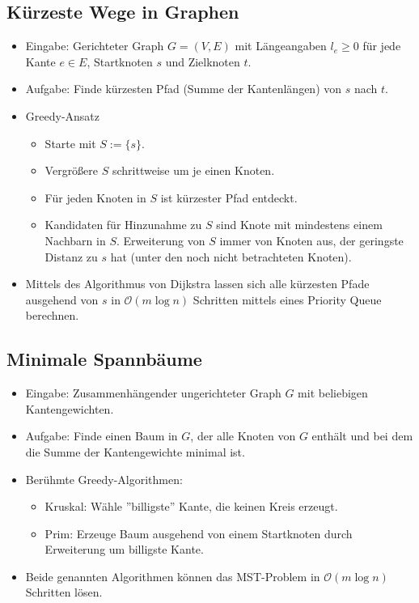 \documentclass{scrartcl}
\begin{document}
\subsection{Kürzeste Wege in Graphen}

\begin{itemize}
	\item Eingabe: Gerichteter Graph $ G = (V,E) $ mit Längeangaben $ l_e \geq 0 $ für jede Kante $ e \in E $, Startknoten $ s $ und Zielknoten $ t $.
	\item Aufgabe: Finde kürzesten Pfad (Summe der Kantenlängen) von $ s $ nach $ t $.
	\item Greedy-Ansatz
	\begin{itemize}
		\item Starte mit $ S := \{ s \} $.
		\item Vergrößere $ S $ schrittweise um je einen Knoten.
		\item Für jeden Knoten in $ S $ ist kürzester Pfad entdeckt.
		\item Kandidaten für Hinzunahme zu $ S $ sind Knote mit mindestens einem Nachbarn in $ S $. Erweiterung von $ S $ immer von Knoten aus, der geringste Distanz zu $ s $ hat (unter den noch nicht betrachteten Knoten).
	\end{itemize}
	\item Mittels des Algorithmus von Dijkstra lassen sich alle kürzesten Pfade ausgehend von $ s $ in $ \mathcal{O}(m \log n) $ Schritten mittels eines Priority Queue berechnen.
\end{itemize}

\subsection{Minimale Spannbäume}

\begin{itemize}
	\item Eingabe: Zusammenhängender ungerichteter Graph $ G $ mit beliebigen Kantengewichten.
	\item Aufgabe: Finde einen Baum in $ G $, der alle Knoten von $ G $ enthält und bei dem die Summe der Kantengewichte minimal ist.
	\item Berühmte Greedy-Algorithmen:
	\begin{itemize}
		\item Kruskal: Wähle ''billigste'' Kante, die keinen Kreis erzeugt.
		\item Prim: Erzeuge Baum ausgehend von einem Startknoten durch Erweiterung um billigste Kante.
	\end{itemize}
	\item Beide genannten Algorithmen können das MST-Problem in $ \mathcal{O}(m \log n) $ Schritten lösen.
\end{itemize}
\end{document}
